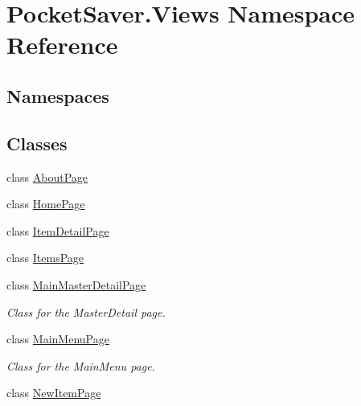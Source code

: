\hypertarget{namespace_pocket_saver_1_1_views}{}\section{Pocket\+Saver.\+Views Namespace Reference}
\label{namespace_pocket_saver_1_1_views}
\subsection*{Namespaces}
\begin{DoxyCompactItemize}
\end{DoxyCompactItemize}
\subsection*{Classes}
\begin{DoxyCompactItemize}
\item 
class \hyperlink{class_pocket_saver_1_1_views_1_1_about_page}{About\+Page}
\item 
class \hyperlink{class_pocket_saver_1_1_views_1_1_home_page}{Home\+Page}
\item 
class \hyperlink{class_pocket_saver_1_1_views_1_1_item_detail_page}{Item\+Detail\+Page}
\item 
class \hyperlink{class_pocket_saver_1_1_views_1_1_items_page}{Items\+Page}
\item 
class \hyperlink{class_pocket_saver_1_1_views_1_1_main_master_detail_page}{Main\+Master\+Detail\+Page}
\begin{DoxyCompactList}\small\item\em Class for the Master\+Detail page. \end{DoxyCompactList}\item 
class \hyperlink{class_pocket_saver_1_1_views_1_1_main_menu_page}{Main\+Menu\+Page}
\begin{DoxyCompactList}\small\item\em Class for the Main\+Menu page. \end{DoxyCompactList}\item 
class \hyperlink{class_pocket_saver_1_1_views_1_1_new_item_page}{New\+Item\+Page}
\end{DoxyCompactItemize}
